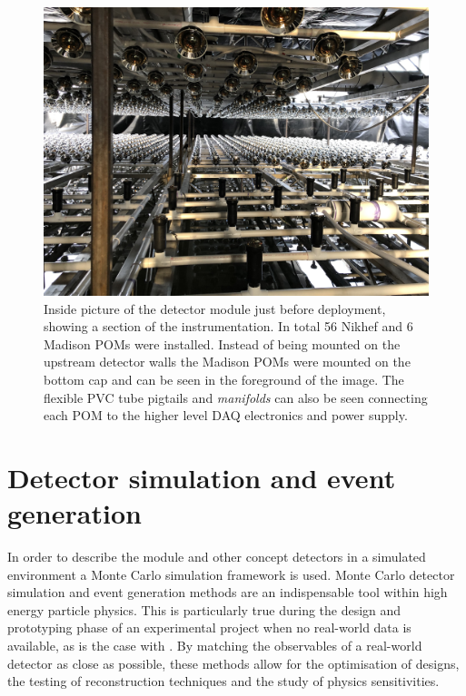 \begin{figure} %
    \includegraphics[width=\textwidth]{diagrams/4-chips/complete.jpeg}
    \caption[Inside picture of the \chipsfive detector module just before deployment]
    {Inside picture of the \chipsfive detector module just before deployment, showing a section of
        the instrumentation. In total 56 Nikhef and 6 Madison POMs were installed. Instead of
        being mounted on the upstream detector walls the Madison POMs were mounted on the bottom
        cap and can be seen in the foreground of the image. The flexible PVC tube pigtails and
        \emph{manifolds} can also be seen connecting each POM to the higher level DAQ electronics
        and power supply.}
    \label{fig:complete}
\end{figure}

\section{Detector simulation and event generation} %
\label{sec:chips_monte_carlo} %

In order to describe the \chipsfive module and other \chips concept detectors in a simulated
environment a Monte Carlo simulation framework is used. Monte Carlo detector simulation and event
generation methods are an indispensable tool within high energy particle physics. This is
particularly true during the design and prototyping phase of an experimental project when no
real-world data is available, as is the case with \chips. By matching the observables of a
real-world detector as close as possible, these methods allow for the optimisation of designs, the
testing of reconstruction techniques and the study of physics sensitivities.

